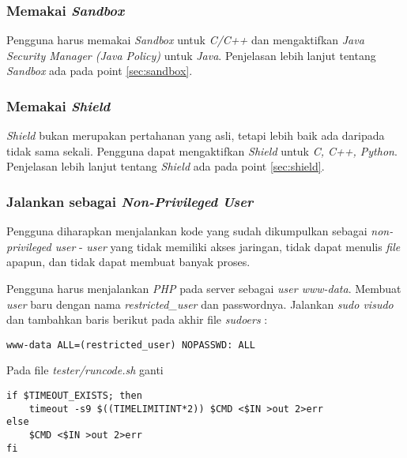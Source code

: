 \subsubsection{Memakai \textit{Sandbox}}
\label{sec:memakai_sandbox}
Pengguna harus memakai \textit{Sandbox} untuk \textit{C/C++} dan mengaktifkan \textit{Java Security Manager (Java Policy)} untuk \textit{Java}. Penjelasan lebih lanjut tentang \textit{Sandbox} ada pada point \ref{sec:sandbox}.

\subsubsection{Memakai \textit{Shield}}
\label{sec:memakai_shield}
\textit{Shield} bukan merupakan pertahanan yang asli, tetapi lebih baik ada daripada tidak sama sekali. Pengguna dapat mengaktifkan \textit{Shield} untuk \textit{C, C++, Python}. Penjelasan lebih lanjut tentang \textit{Shield} ada pada point \ref{sec:shield}.

\subsubsection{Jalankan sebagai \textit{Non-Privileged User}}
\label{sec:non_prileged_user}
Pengguna diharapkan menjalankan kode yang sudah dikumpulkan sebagai \textit{non-privileged user} - \textit{user} yang tidak memiliki akses jaringan, tidak dapat menulis \textit{file} apapun, dan tidak dapat membuat banyak proses.

Pengguna harus menjalankan \textit{PHP} pada server sebagai \textit{user www-data}. Membuat \textit{user} baru dengan nama \textit{restricted\_user} dan passwordnya. Jalankan \textit{sudo visudo} dan tambahkan baris berikut pada akhir file \textit{sudoers} :

\begin{lstlisting}[basicstyle=\ttfamily, frame=single,
columns=fullflexible, keepspaces=true, breaklines=true, label=ls:13]
www-data ALL=(restricted_user) NOPASSWD: ALL
\end{lstlisting}

Pada file \textit{tester/runcode.sh} ganti 

\begin{lstlisting}[basicstyle=\ttfamily, frame=single,
columns=fullflexible, keepspaces=true, breaklines=true, label=ls:14]
if $TIMEOUT_EXISTS; then
	timeout -s9 $((TIMELIMITINT*2)) $CMD <$IN >out 2>err
else
	$CMD <$IN >out 2>err        
fi
\end{lstlisting}

